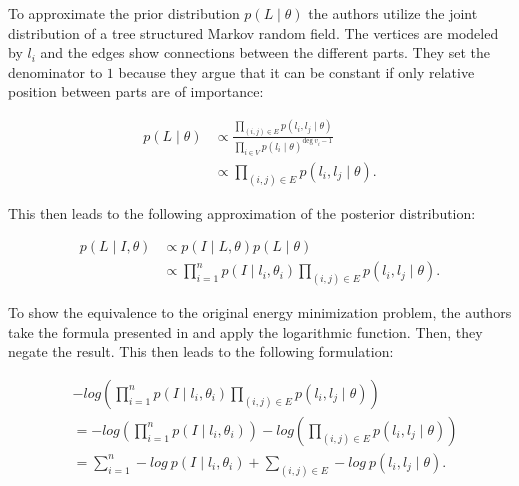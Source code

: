 To approximate the prior distribution $p(L \mid \theta)$ the authors utilize the joint distribution of a tree structured Markov random field.
The vertices are modeled by $l_i$ and the edges show connections between the different parts. 
They set the denominator to $1$ because they argue that it can be constant if only relative position between parts are of importance:

\begin{equation}
    \begin{split}
        p(L \mid \theta) 
        &\propto \frac{\prod_{(i,j) \in E} p(l_i, l_j \mid \theta)}{\prod_{i \in V} p(l_i \mid \theta)^{\text{deg} ~ v_i -1}} \\
        &\propto \prod_{(i, j) \in E} p(l_i, l_j \mid \theta).
    \end{split}
\end{equation}

This then leads to the following approximation of the posterior distribution:

\begin{equation}
    \label{eq:pictoral-posterior-general}
    \begin{split}
        p(L \mid I, \theta) 
        &\propto p(I \mid L, \theta) p(L \mid \theta) \\
        &\propto \prod_{i=1}^n p(I \mid l_i, \theta_i) \prod_{(i, j) \in E} p(l_i, l_j \mid \theta).
    \end{split} 
\end{equation}

To show the equivalence to the original energy minimization problem, the authors take the formula presented in  and apply the logarithmic function. Then, they negate the result.
This then leads to the following formulation:

\begin{equation}
    \label{eq:neg-log-posterior}
    \begin{split}
        &-log \left( \prod_{i=1}^n p(I \mid l_i, \theta_i) \prod_{(i, j) \in E} p(l_i, l_j \mid \theta) \right) \\
        &= -log \left( \prod_{i=1}^n p(I \mid l_i, \theta_i) \right) - log \left( \prod_{(i, j) \in E} p(l_i, l_j \mid \theta)\right) \\
        &= \sum_{i=1}^n -log ~ p(I \mid l_i, \theta_i) + \sum_{(i, j) \in E} - log ~ p(l_i, l_j \mid \theta).
    \end{split}
\end{equation}


